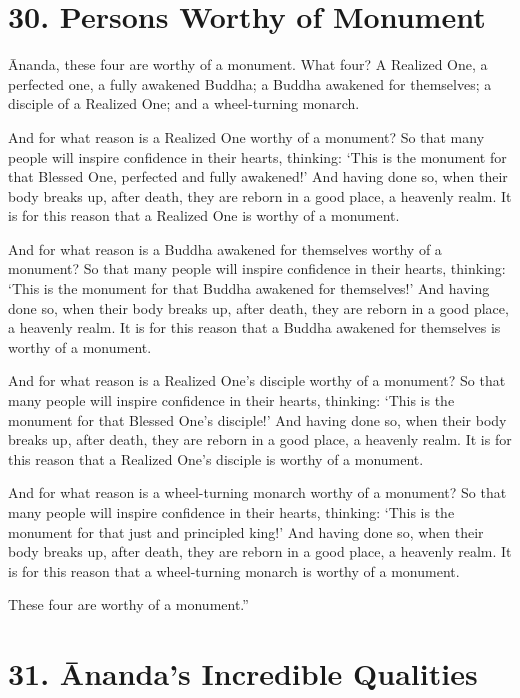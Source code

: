 \documentclass[12pt,openany]{book}%
\begin{document}
\section*{30. Persons Worthy of Monument }

Ānanda, these four are worthy of a monument. What four? A Realized One, a perfected one, a fully awakened Buddha; a Buddha awakened for themselves; a disciple of a Realized One; and a wheel-turning monarch. 

And for what reason is a Realized One worthy of a monument? So that many people will inspire confidence in their hearts, thinking: ‘This is the monument for that Blessed One, perfected and fully awakened!’ And having done so, when their body breaks up, after death, they are reborn in a good place, a heavenly realm. It is for this reason that a Realized One is worthy of a monument. 

And for what reason is a Buddha awakened for themselves worthy of a monument? So that many people will inspire confidence in their hearts, thinking: ‘This is the monument for that Buddha awakened for themselves!’ And having done so, when their body breaks up, after death, they are reborn in a good place, a heavenly realm. It is for this reason that a Buddha awakened for themselves is worthy of a monument. 

And for what reason is a Realized One’s disciple worthy of a monument? So that many people will inspire confidence in their hearts, thinking: ‘This is the monument for that Blessed One’s disciple!’ And having done so, when their body breaks up, after death, they are reborn in a good place, a heavenly realm. It is for this reason that a Realized One’s disciple is worthy of a monument. 

And for what reason is a wheel-turning monarch worthy of a monument? So that many people will inspire confidence in their hearts, thinking: ‘This is the monument for that just and principled king!’ And having done so, when their body breaks up, after death, they are reborn in a good place, a heavenly realm. It is for this reason that a wheel-turning monarch is worthy of a monument. 

These four are worthy of a monument.” 

\section*{31. Ānanda’s Incredible Qualities }
\end{document}
